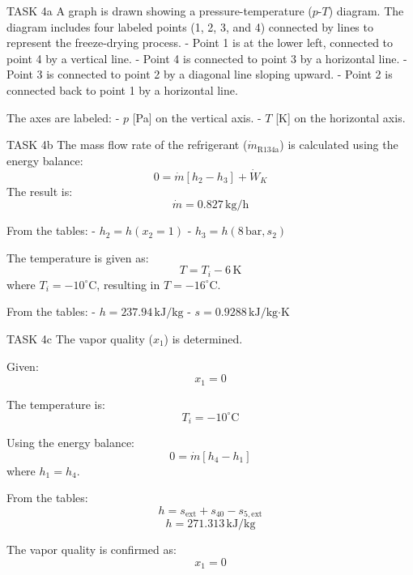 TASK 4a  
A graph is drawn showing a pressure-temperature (\( p \)-\( T \)) diagram. The diagram includes four labeled points (1, 2, 3, and 4) connected by lines to represent the freeze-drying process.  
- Point 1 is at the lower left, connected to point 4 by a vertical line.  
- Point 4 is connected to point 3 by a horizontal line.  
- Point 3 is connected to point 2 by a diagonal line sloping upward.  
- Point 2 is connected back to point 1 by a horizontal line.  

The axes are labeled:  
- \( p \) [Pa] on the vertical axis.  
- \( T \) [K] on the horizontal axis.  

TASK 4b  
The mass flow rate of the refrigerant (\( \dot{m}_{\text{R134a}} \)) is calculated using the energy balance:  
\[
0 = \dot{m} \left[ h_2 - h_3 \right] + \dot{W}_K
\]  
The result is:  
\[
\dot{m} = 0.827 \, \text{kg/h}
\]  

From the tables:  
- \( h_2 = h(x_2 = 1) \)  
- \( h_3 = h(8 \, \text{bar}, s_2) \)  

The temperature is given as:  
\[
T = T_i - 6 \, \text{K}
\]  
where \( T_i = -10^\circ\text{C} \), resulting in \( T = -16^\circ\text{C} \).  

From the tables:  
- \( h = 237.94 \, \text{kJ/kg} \)  
- \( s = 0.9288 \, \text{kJ/kg·K} \)  

TASK 4c  
The vapor quality (\( x_1 \)) is determined.  

Given:  
\[
x_1 = 0
\]  

The temperature is:  
\[
T_i = -10^\circ\text{C}
\]  

Using the energy balance:  
\[
0 = \dot{m} \left[ h_4 - h_1 \right]
\]  
where \( h_1 = h_4 \).  

From the tables:  
\[
h = s_{\text{ext}} + s_{40} - s_{5,\text{ext}}
\]  
\[
h = 271.313 \, \text{kJ/kg}
\]  

The vapor quality is confirmed as:  
\[
x_1 = 0
\]